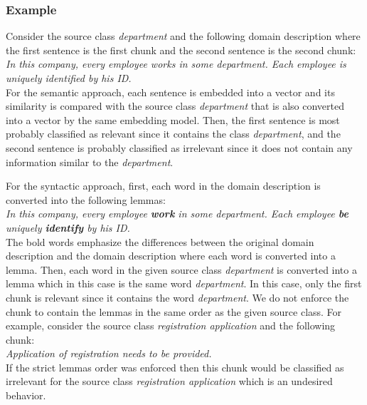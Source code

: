 \subsubsection{Example}

Consider the source class \textit{department} and the following domain description where the first sentence is the first chunk and the second sentence is the second chunk: \\

\noindent{}\textit{In this company, every employee works in some department. Each employee is uniquely identified by his ID.} \\

For the semantic approach, each sentence is embedded into a vector and its similarity is compared with the source class \textit{department} that is also converted into a vector by the same embedding model. Then, the first sentence is most probably classified as relevant since it contains the class \textit{department}, and the second sentence is probably classified as irrelevant since it does not contain any information similar to the \textit{department}.

For the syntactic approach, first, each word in the domain description is converted into the following lemmas: \\

\noindent{}\textit{In this company, every employee \textbf{work} in some department. Each employee \textbf{be} uniquely \textbf{identify} by his ID.} \\

\noindent{}The bold words emphasize the differences between the original domain description and the domain description where each word is converted into a lemma. Then, each word in the given source class \textit{department} is converted into a lemma which in this case is the same word \textit{department}.  In this case, only the first chunk is relevant since it contains the word \textit{department}. We do not enforce the chunk to contain the lemmas in the same order as the given source class. For example, consider the source class \textit{registration application} and the following chunk: \\

\noindent{}\textit{Application of registration needs to be provided.} \\

\noindent{}If the strict lemmas order was enforced then this chunk would be classified as irrelevant for the source class \textit{registration application} which is an undesired behavior.


